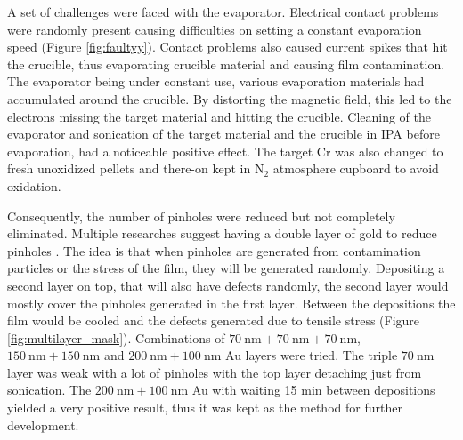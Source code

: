 \documentclass[final]{jyflluk}
\begin{document}
A set of challenges were faced with the evaporator. Electrical contact problems were randomly present causing difficulties on setting a constant evaporation speed (Figure \ref{fig:faultyy}). Contact problems also caused current spikes that hit the crucible, thus evaporating crucible material and causing film contamination. The evaporator being under constant use, various evaporation materials had accumulated around the crucible. By distorting the magnetic field, this led to the electrons missing the target material and hitting the crucible. Cleaning of the evaporator and sonication of the target material and the crucible in IPA before evaporation, had a noticeable positive effect. The target Cr was also changed to fresh unoxidized pellets and there-on kept in $\mathrm{N_2}$ atmosphere cupboard to avoid oxidation. 

Consequently, the number of pinholes were reduced but not completely eliminated. Multiple researches suggest having a double layer of gold to reduce pinholes \cite{iliescu2008wet,Hgglund2013CharacterizationOM,bu2004new}. The idea is that when pinholes are generated from contamination particles or the stress of the film, they will be generated randomly. Depositing a second layer on top, that will also have defects randomly, the second layer would mostly cover the pinholes generated in the first layer. Between the depositions the film would be cooled and the defects generated due to tensile stress (Figure \ref{fig:multilayer_mask}). 
Combinations of $\SI{70}{\nano \metre} + \SI{70}{\nano \metre} + \SI{70}{\nano \metre}$, $\SI{150}{\nano \metre}+ \SI{150}{\nano \metre}$ and $\SI{200}{\nano \metre} + \SI{100}{\nano \metre}$ Au layers were tried. The triple $\SI{70}{\nano \metre}$ layer was weak with a lot of pinholes with the top layer detaching just from sonication. The $\SI{200}{\nano \metre} + \SI{100}{\nano \metre}$  Au with waiting 15 min between depositions yielded a very positive result, thus it was kept as the method for further development.
\newpage
\end{document}
